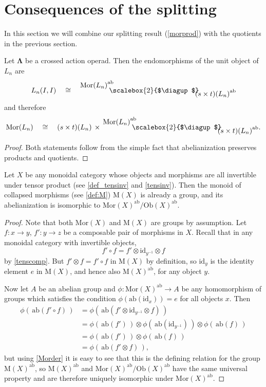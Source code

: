 \documentclass{amsbook} %
\newcommand{\id}{\textrm{id}}
\newcommand{\ML}{\mathbf{\Lambda}}
\newcommand{\MorLn}{\mathrm{Mor}(L_n)}
\newcommand{\bigquotient}[2]{ \raisebox{0.75\height}{$#1$} \mkern-12mu\scalebox{2}{$\diagup$}\mkern-10mu \raisebox{-0.5\height}{$#2$} }
\newcommand{\ab}{\mathrm{ab}}
\numberwithin{section}{chapter}
\begin{document}
\section{Consequences of the splitting}\label{conseq_spl}

In this section we will combine our splitting result (\cref{morprod}) with the quotients in the previous section.

\begin{cor}\label{Zmor1} Let $\ML$ be a crossed action operad. Then the endomorphisms of the unit object of $L_n$ are
  \[
    L_n(I, I) \quad \cong \quad \bigquotient{{\MorLn}^{\ab}}{{(s \times t)(L_n)}^{\ab}}
  \]
and therefore
  \[
    \MorLn \quad \cong \quad (s \times t)(L_n) \, \times \, \bigquotient{{\MorLn}^{\ab}}{{(s \times t)(L_n)}^{\ab}}.
  \]
\end{cor}
\begin{proof}
Both statements follow from the simple fact that abelianization preserves products and quotients.
\end{proof}

\begin{lem} \label{colquot} Let $X$ be any monoidal category whose objects and morphisms are all invertible under tensor product (see \cref{def_tensinv} and \cref{tensinv}). Then the monoid of collapsed morphisms (see \cref{def:M}) $\mathrm{M}(X)$ is already a group, and its abelianization is isomorphic to $\mathrm{Mor}(X)^{\ab}/ \mathrm{Ob}(X)^{\ab}$.
\end{lem}
\begin{proof}
Note that both $\mathrm{Mor}(X)$ and $\mathrm{M}(X)$ are groups by assumption. Let  $f \colon  x \rightarrow y$, $f' \colon  y \rightarrow z$ be a composable pair of morphisms in $X$. Recall  that in any monoidal category with invertible objects,
  \[
    f' \circ f = f' \otimes \id_{y^{-1}} \otimes f
  \]
by \cref{tenscomp}.  But $f' \otimes f = f' \circ f$ in $\mathrm{M}(X)$ by definition, so $\id_y$ is the identity element $e$ in $\mathrm{M}(X)$, and hence also $\mathrm{M}(X)^{\ab}$, for any object $y$.

Now let $A$ be an abelian group and $\phi \colon  \mathrm{Mor}(X)^{\ab} \rightarrow A$ be any homomorphism of groups which satisfies the condition $\phi(\ab(\id_x)) = e$ for all objects $x$. Then
  \begin{align*}
		\phi\left( \, \ab(f' \circ f) \, \right)  &= \phi\left( \, \ab(f' \otimes \id_{y^{-1}} \otimes f) \, \right) \\
		&= \phi\left( \, \ab(f') \, \right) \otimes \phi\left( \, \ab(\id_{y^{-1}}) \, \right) \otimes \phi\left( \, \ab(f) \, \right) \\
		&= \phi\left( \, \ab(f') \, \right) \otimes \phi\left( \, \ab(f) \, \right) \\
		&= \phi\left( \, \ab(f' \otimes f) \, \right),
	\end{align*}
but using \cref{Morder} it is easy to see that this is the defining relation for the group $\mathrm{M}(X)^{\ab}$, so $\mathrm{M}(X)^{\ab}$ and $\mathrm{Mor}(X)^{\ab}/\mathrm{Ob}(X)^{\ab}$ have the same universal property and are therefore uniquely isomorphic under $\mathrm{Mor}(X)^{\ab}$.
\end{proof}
\end{document}
